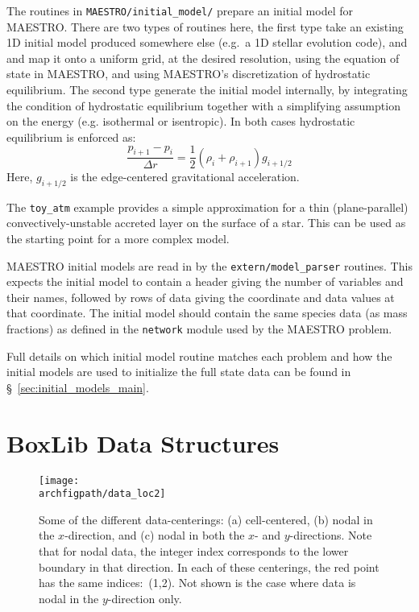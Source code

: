 The routines in {\tt MAESTRO/initial\_model/} prepare an initial model
for MAESTRO.  There are two types of routines here, the first type
take an existing 1D initial model produced somewhere else (e.g.\ a
1D stellar evolution code), and and map it onto a uniform grid, at
the desired resolution, using the equation of state in MAESTRO, and
using MAESTRO's discretization of hydrostatic equilibrium.  The second
type generate the initial model internally, by integrating the
condition of hydrostatic equilibrium together with a simplifying
assumption on the energy (e.g. isothermal or isentropic).  In
both cases hydrostatic equilibrium is enforced as:
\begin{equation}
\frac{p_{i+1} - p_i}{\Delta r} = \frac{1}{2} (\rho_i + \rho_{i+1})
g_{i+1/2}
\end{equation}
Here, $g_{i+1/2}$ is the edge-centered gravitational acceleration.

The {\tt toy\_atm} example provides a simple approximation for a thin
(plane-parallel) convectively-unstable accreted layer on the surface
of a star.  This can be used as the starting point for a more complex
model.  

MAESTRO initial models are read in by the {\tt extern/model\_parser}
routines.  This expects the initial model to contain a header giving
the number of variables and their names, followed by rows of data
giving the coordinate and data values at that coordinate.  The initial
model should contain the same species data (as mass fractions) as
defined in the {\tt network} module used by the MAESTRO problem.

Full details on which initial model routine matches each problem and
how the initial models are used to initialize the full state data can
be found in \S~\ref{sec:initial_models_main}.



\section{BoxLib Data Structures}

\begin{figure}[t]
\centering
\texttt{[image: \\archfigpath/data\_loc2]}
\caption[Data-centerings on the grid]
  {\label{fig:dataloc} Some of the different data-centerings:
  (a) cell-centered, (b) nodal in the $x$-direction, and (c) nodal in
  both the $x$- and $y$-directions.  Note that for nodal data, the
  integer index corresponds to the lower boundary in that direction.
  In each of these centerings, the red point has the same indices:\ (1,2).
  Not shown is the case where data is nodal in the $y$-direction only.}
\end{figure}

